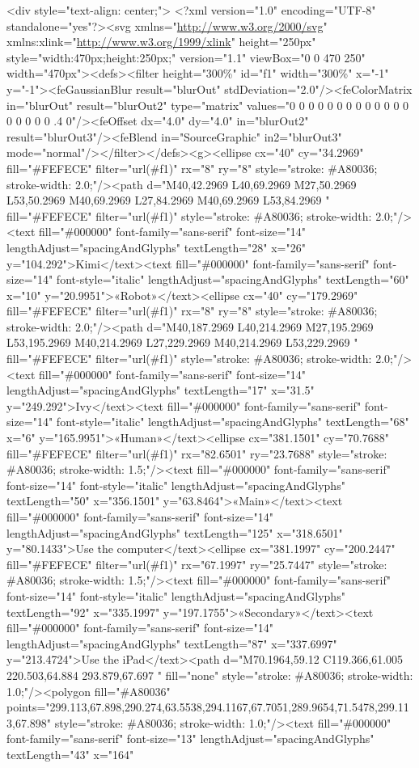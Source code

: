 \documentclass[11pt]{article}
\begin{document}
\begin{HTML}
<div style="text-align: center;">
<?xml version="1.0" encoding="UTF-8" standalone="yes"?><svg xmlns="\url{http://www.w3.org/2000/svg}" xmlns:xlink="\url{http://www.w3.org/1999/xlink}" height="250px" style="width:470px;height:250px;" version="1.1" viewBox="0 0 470 250" width="470px"><defs><filter height="300\%" id="f1" width="300\%" x="-1" y="-1"><feGaussianBlur result="blurOut" stdDeviation="2.0"/><feColorMatrix in="blurOut" result="blurOut2" type="matrix" values="0 0 0 0 0 0 0 0 0 0 0 0 0 0 0 0 0 0 .4 0"/><feOffset dx="4.0" dy="4.0" in="blurOut2" result="blurOut3"/><feBlend in="SourceGraphic" in2="blurOut3" mode="normal"/></filter></defs><g><ellipse cx="40" cy="34.2969" fill="\#FEFECE" filter="url(\#f1)" rx="8" ry="8" style="stroke: \#A80036; stroke-width: 2.0;"/><path d="M40,42.2969 L40,69.2969 M27,50.2969 L53,50.2969 M40,69.2969 L27,84.2969 M40,69.2969 L53,84.2969 " fill="\#FEFECE" filter="url(\#f1)" style="stroke: \#A80036; stroke-width: 2.0;"/><text fill="\#000000" font-family="sans-serif" font-size="14" lengthAdjust="spacingAndGlyphs" textLength="28" x="26" y="104.292">Kimi</text><text fill="\#000000" font-family="sans-serif" font-size="14" font-style="italic" lengthAdjust="spacingAndGlyphs" textLength="60" x="10" y="20.9951">«Robot»</text><ellipse cx="40" cy="179.2969" fill="\#FEFECE" filter="url(\#f1)" rx="8" ry="8" style="stroke: \#A80036; stroke-width: 2.0;"/><path d="M40,187.2969 L40,214.2969 M27,195.2969 L53,195.2969 M40,214.2969 L27,229.2969 M40,214.2969 L53,229.2969 " fill="\#FEFECE" filter="url(\#f1)" style="stroke: \#A80036; stroke-width: 2.0;"/><text fill="\#000000" font-family="sans-serif" font-size="14" lengthAdjust="spacingAndGlyphs" textLength="17" x="31.5" y="249.292">Ivy</text><text fill="\#000000" font-family="sans-serif" font-size="14" font-style="italic" lengthAdjust="spacingAndGlyphs" textLength="68" x="6" y="165.9951">«Human»</text><ellipse cx="381.1501" cy="70.7688" fill="\#FEFECE" filter="url(\#f1)" rx="82.6501" ry="23.7688" style="stroke: \#A80036; stroke-width: 1.5;"/><text fill="\#000000" font-family="sans-serif" font-size="14" font-style="italic" lengthAdjust="spacingAndGlyphs" textLength="50" x="356.1501" y="63.8464">«Main»</text><text fill="\#000000" font-family="sans-serif" font-size="14" lengthAdjust="spacingAndGlyphs" textLength="125" x="318.6501" y="80.1433">Use the computer</text><ellipse cx="381.1997" cy="200.2447" fill="\#FEFECE" filter="url(\#f1)" rx="67.1997" ry="25.7447" style="stroke: \#A80036; stroke-width: 1.5;"/><text fill="\#000000" font-family="sans-serif" font-size="14" font-style="italic" lengthAdjust="spacingAndGlyphs" textLength="92" x="335.1997" y="197.1755">«Secondary»</text><text fill="\#000000" font-family="sans-serif" font-size="14" lengthAdjust="spacingAndGlyphs" textLength="87" x="337.6997" y="213.4724">Use the iPad</text><path d="M70.1964,59.12 C119.366,61.005 220.503,64.884 293.879,67.697 " fill="none" style="stroke: \#A80036; stroke-width: 1.0;"/><polygon fill="\#A80036" points="299.113,67.898,290.274,63.5538,294.1167,67.7051,289.9654,71.5478,299.113,67.898" style="stroke: \#A80036; stroke-width: 1.0;"/><text fill="\#000000" font-family="sans-serif" font-size="13" lengthAdjust="spacingAndGlyphs" textLength="43" x="164" 
\end{HTML}
\end{document}
